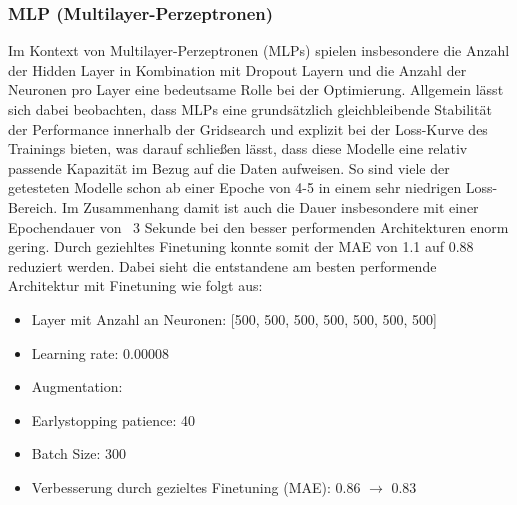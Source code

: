 \documentclass[manuscript,screen,review]{acmart}
\begin{document}
\subsubsection*{MLP (Multilayer-Perzeptronen)}
Im Kontext von Multilayer-Perzeptronen (MLPs) spielen insbesondere die Anzahl der Hidden Layer in Kombination mit Dropout Layern und die Anzahl der Neuronen pro Layer eine bedeutsame Rolle bei der Optimierung.
Allgemein lässt sich dabei beobachten, dass MLPs eine grundsätzlich gleichbleibende Stabilität der Performance innerhalb der Gridsearch und explizit bei der Loss-Kurve des Trainings bieten, was darauf schließen lässt, dass diese Modelle eine relativ passende Kapazität im Bezug auf die Daten aufweisen. So sind viele der getesteten Modelle schon ab einer Epoche von 4-5 in einem sehr niedrigen Loss-Bereich.  Im Zusammenhang damit ist auch die Dauer insbesondere mit einer Epochendauer von ~3 Sekunde bei den besser performenden Architekturen enorm gering.
Durch geziehltes Finetuning konnte somit der MAE von 1.1 auf 0.88 reduziert werden.
Dabei sieht die entstandene am besten performende Architektur mit Finetuning wie folgt aus:
\begin{itemize}
    \item Layer mit Anzahl an Neuronen: [500, 500, 500, 500, 500, 500, 500]
    \item Learning rate: 0.00008
    \item Augmentation: 
    \item Earlystopping patience: 40
    \item Batch Size: 300
    \item Verbesserung durch gezieltes Finetuning (MAE): 0.86 $\rightarrow$ 0.83
\end{itemize}

\end{document}
